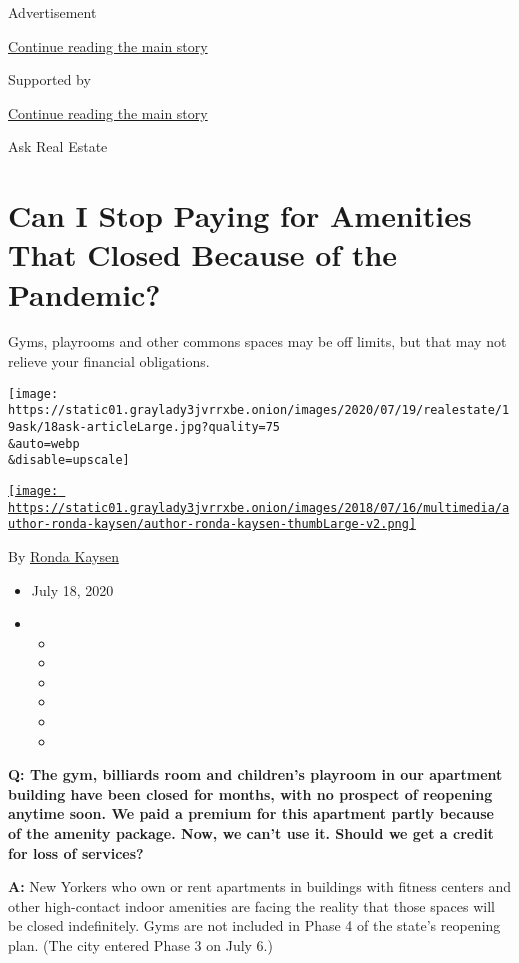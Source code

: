 Advertisement

\protect\hyperlink{after-top}{Continue reading the main story}

Supported by

\protect\hyperlink{after-sponsor}{Continue reading the main story}

Ask Real Estate

\hypertarget{can-i-stop-paying-for-amenities-that-closed-because-of-the-pandemic}{%
\section{Can I Stop Paying for Amenities That Closed Because of the
Pandemic?}\label{can-i-stop-paying-for-amenities-that-closed-because-of-the-pandemic}}

Gyms, playrooms and other commons spaces may be off limits, but that may
not relieve your financial obligations.

\texttt{[image: https://static01.graylady3jvrrxbe.onion/images/2020/07/19/realestate/19ask/18ask-articleLarge.jpg?quality=75\\\&auto=webp\\\&disable=upscale]}

\href{https://www.nytimes3xbfgragh.onion/by/ronda-kaysen}{\texttt{[image: https://static01.graylady3jvrrxbe.onion/images/2018/07/16/multimedia/author-ronda-kaysen/author-ronda-kaysen-thumbLarge-v2.png]}}

By \href{https://www.nytimes3xbfgragh.onion/by/ronda-kaysen}{Ronda
Kaysen}

\begin{itemize}
\item
  July 18, 2020
\item
  \begin{itemize}
  \item
  \item
  \item
  \item
  \item
  \item
  \end{itemize}
\end{itemize}

\textbf{Q: The gym, billiards room and children's playroom in our
apartment building have been closed for months, with no prospect of
reopening anytime soon. We paid a premium for this apartment partly
because of the amenity package. Now, we can't use it. Should we get a
credit for loss of services?}

\textbf{A:} New Yorkers who own or rent apartments in buildings with
fitness centers and other high-contact indoor amenities are facing the
reality that those spaces will be closed indefinitely. Gyms are not
included in Phase 4 of the state's reopening plan. (The city entered
Phase 3 on July 6.)


